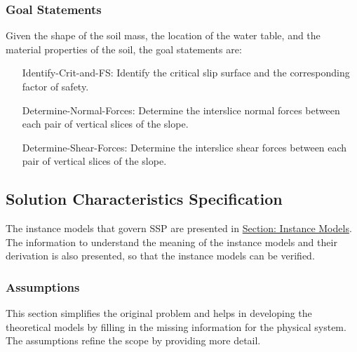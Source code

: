 \documentclass[12pt]{article}
\begin{document}
\subsubsection{Goal Statements}
\label{Sec:GoalStmt}
Given the shape of the soil mass, the location of the water table, and the material properties of the soil, the goal statements are:

\begin{itemize}
\item[Identify-Crit-and-FS:\phantomsection\label{identifyCritAndFS}]Identify the critical slip surface and the corresponding factor of safety.
\item[Determine-Normal-Forces:\phantomsection\label{determineNormalF}]Determine the interslice normal forces between each pair of vertical slices of the slope.
\item[Determine-Shear-Forces:\phantomsection\label{determineShearF}]Determine the interslice shear forces between each pair of vertical slices of the slope.
\end{itemize}
\subsection{Solution Characteristics Specification}
\label{Sec:SolCharSpec}
The instance models that govern SSP are presented in \hyperref[Sec:IMs]{Section: Instance Models}. The information to understand the meaning of the instance models and their derivation is also presented, so that the instance models can be verified.

\subsubsection{Assumptions}
\label{Sec:Assumps}
This section simplifies the original problem and helps in developing the theoretical models by filling in the missing information for the physical system. The assumptions refine the scope by providing more detail.
\end{document}
